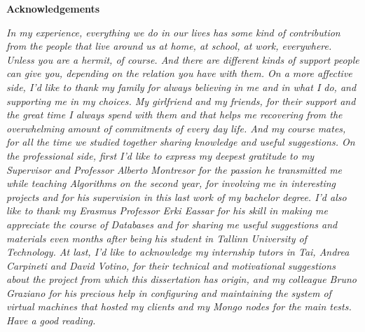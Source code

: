 \thispagestyle{empty}

\begin{center}
  {\bf \Huge Acknowledgements}
\end{center}

\vspace{4cm}


\emph{
  In my experience, everything we do in our lives has some kind of contribution from the people that live around us at home, at school, at work, everywhere. Unless you are a hermit, of course. And there are different kinds of support people can give you, depending on the relation you have with them. 
On a more affective side, I’d like to thank my family for always believing in me and in what I do, and supporting me in my choices. My girlfriend and my friends, for their support and the great time I always spend with them and that helps me recovering from the overwhelming amount of commitments of every day life. And my course mates, for all the time we studied together sharing knowledge and useful suggestions.
On the professional side, first I’d like to express my deepest gratitude to my Supervisor and Professor Alberto Montresor for the passion he transmitted me while teaching Algorithms on the second year, for involving me in interesting projects and for his supervision in this last work of my bachelor degree.
I’d also like to thank my Erasmus Professor Erki Eassar for his skill in making me appreciate the course of Databases and for sharing me useful suggestions and materials even months after being his student in Tallinn University of Technology.
At last, I’d like to acknowledge my internship tutors in Tai, Andrea Carpineti and David Votino, for their technical and motivational suggestions about the project from which this dissertation has origin, and my colleague Bruno Graziano for his precious help in configuring and maintaining the system of virtual machines that hosted my clients and my Mongo nodes for the main tests. 
Have a good reading.
}

